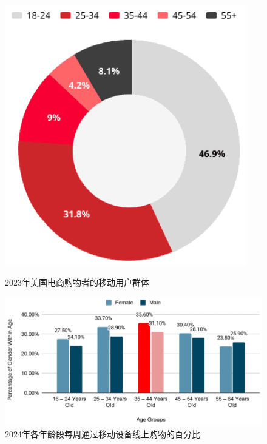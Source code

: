 \documentclass[12pt]{ctexart}
\begin{document}
\begin{figure}[htbp!]
    \begin{minipage}[t]{0.31\textwidth}
        \centering
        \includegraphics[width=\textwidth]{Images/14.png}
        \caption{2023年美国电商购物者的移动用户群体\cite{18}}
        \label{us_mobile}
    \end{minipage}
    \hfill
    \begin{minipage}[t]{0.667\textwidth}
        \centering
        \includegraphics[width=\textwidth]{Images/15.png}
        \caption{2024年各年龄段每周通过移动设备线上购物的百分比 \cite{19}}
        \label{all_mobile}
    \end{minipage}
\end{figure}
\end{document}
